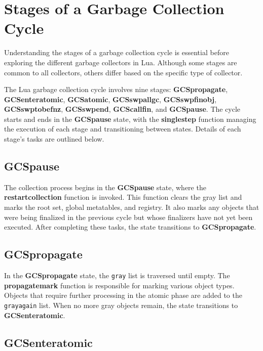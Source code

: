 \documentclass[10pt]{article}
\begin{document}
\section{Stages of a Garbage Collection Cycle} \label{sec:gc_cycle}

Understanding the stages of a garbage collection cycle is essential before exploring the different garbage collectors in Lua. Although some stages are common to all collectors, others differ based on the specific type of collector.

The Lua garbage collection cycle involves nine stages: \textbf{GCSpropagate}, \textbf{GCSenteratomic}, \textbf{GCSatomic}, \textbf{GCSswpallgc}, \textbf{GCSswpfinobj}, \textbf{GCSswptobefnz}, \textbf{GCSswpend}, \textbf{GCScallfin}, and \textbf{GCSpause}. The cycle starts and ends in the \textbf{GCSpause} state, with the \textbf{singlestep} function managing the execution of each stage and transitioning between states. Details of each stage's tasks are outlined below.


\subsection{GCSpause} \label{sec:gcspause}

The collection process begins in the \textbf{GCSpause} state, where the \textbf{restartcollection} function is invoked. This function clears the gray list and marks the root set, global metatables, and registry. It also marks any objects that were being finalized in the previous cycle but whose finalizers have not yet been executed. After completing these tasks, the state transitions to \textbf{GCSpropagate}.


\subsection{GCSpropagate} \label{sec:gcspropagate}

In the \textbf{GCSpropagate} state, the \texttt{gray} list is traversed until empty. The \textbf{propagatemark} function is responsible for marking various object types. Objects that require further processing in the atomic phase are added to the \texttt{grayagain} list. When no more gray objects remain, the state transitions to \textbf{GCSenteratomic}.


\subsection{GCSenteratomic} \label{sec:gcsenteratomic}
\end{document}
